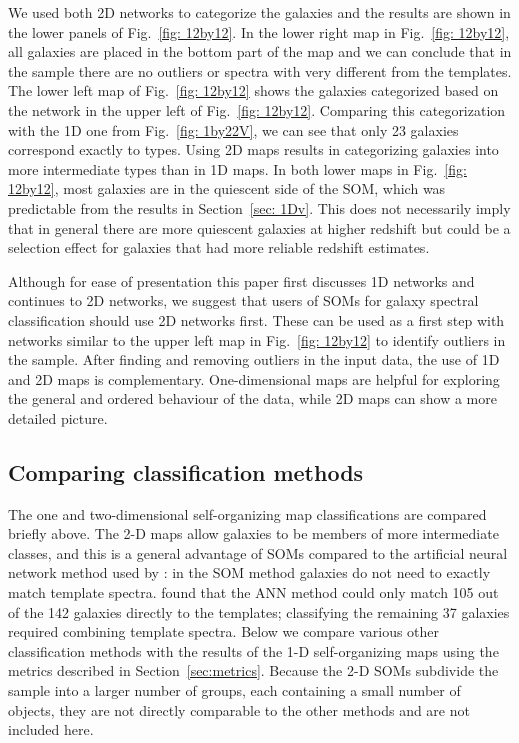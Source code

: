     
        We used both 2D networks to categorize the  galaxies and the results are shown in the lower panels of Fig.~\ref{fig: 12by12}.
        In the lower right map in Fig.~\ref{fig: 12by12}, all galaxies are placed in the bottom part of the map and we can conclude that in the  sample there are no outliers or spectra with very different from the  templates.
        The lower left map of Fig.~\ref{fig: 12by12} shows the  galaxies categorized based on the network in the upper left of Fig.~\ref{fig: 12by12}. 
        Comparing this categorization with the 1D one from Fig.~\ref{fig: 1by22V}, we can see that only 23 galaxies correspond exactly to  types.
        Using 2D maps results in categorizing galaxies into more intermediate types than in 1D maps.
        In both lower maps in Fig.~\ref{fig: 12by12}, most galaxies are in the quiescent side of the SOM, which was predictable from the results in Section~\ref{sec: 1Dv}.
        This does not necessarily imply that in general there are more quiescent galaxies at higher redshift but could be a selection effect for galaxies that had more reliable redshift estimates.
        
    Although for ease of presentation this paper first discusses 1D networks and continues to 2D networks, we suggest that users of SOMs for galaxy spectral classification should use 2D networks first.
         These can be used as a first step with networks similar to the upper left map in Fig.~\ref{fig: 12by12} to identify outliers in the sample.
        After finding and removing outliers in the input data, the use of 1D and 2D maps is complementary.
        One-dimensional maps are helpful for exploring the general and ordered behaviour of the data, while 2D maps can show a more detailed picture.
 
\subsection{Comparing classification methods}
    \label{sec: Kmeansvssomvsann}
   
    The one and two-dimensional self-organizing map classifications are compared briefly above. 
    The 2-D maps allow galaxies to be members of more intermediate classes, and this is a general advantage of SOMs compared to the artificial neural network method used by : in the SOM method galaxies do not need to exactly match template spectra. 
     found that the ANN method could only match 105 out of the 142 galaxies directly to the  templates; classifying the remaining 37 galaxies required combining template spectra.
    Below we compare various other classification methods with the results of the 1-D self-organizing maps using the metrics described in Section~\ref{sec:metrics}.
    Because the 2-D SOMs subdivide the sample into a larger number of groups, each containing a small number of objects, they are not directly comparable to the other methods and are not included here.
       
